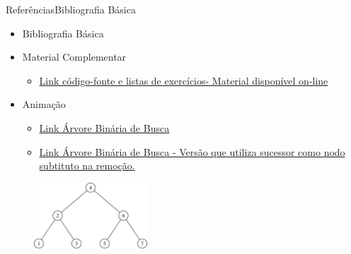 \documentclass[aspectratio=169]{beamer}
\begin{document}

\begin{frame}{Referências}{Bibliografia Básica}

\begin{itemize}
\item Bibliografia Básica


\item Material Complementar
\begin{itemize}
\item \href{https://programacaodescomplicada.wordpress.com/complementar/}{Link código-fonte e listas de exercícios- Material disponível on-line}
\end{itemize}
\item Animação
\begin{itemize}
\item \href{https://www.cs.usfca.edu/~galles/visualization/BST.html}{Link Árvore Binária de Busca}
\item \href{http://btv.melezinek.cz/binary-search-tree.html}{Link Árvore Binária de Busca - Versão que utiliza sucessor como nodo subtituto na remoção.}
\end{itemize}
\end{itemize}
\end{frame}

\begin{frame}
\titlepage %

\begin{figure}[!h]
  \centering
   \includegraphics[width=120pt]{imagens/introducao.png}
  \label{fig_introducao}
\end{figure}
\end{frame}

\end{document}
